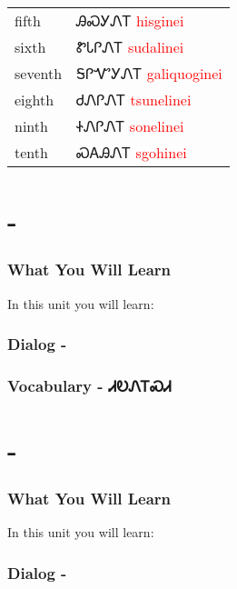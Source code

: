 \begin{tabular}{p{3cm} p{11cm}}
fifth & ᎯᏍᎩᏁᎢ 
 \newline \textcolor{red}{hisginei}\\
sixth & ᏑᏓᎵᏁᎢ 
 \newline \textcolor{red}{sudalinei}\\
seventh & ᎦᎵᏉᎩᏁᎢ 
 \newline \textcolor{red}{galiquoginei}\\
eighth & ᏧᏁᎵᏁᎢ 
 \newline \textcolor{red}{tsunelinei}\\
ninth & ᏐᏁᎵᏁᎢ 
 \newline \textcolor{red}{sonelinei}\\
tenth & ᏍᎪᎯᏁᎢ 
 \newline \textcolor{red}{sgohinei}\\
\end{tabular}

\chapter{ - }
\subsection{What You Will Learn}
In this unit you will learn:


\subsection{Dialog - }
\subsection{Vocabulary - ᏗᎧᏁᎢᏍᏗ }



\chapter{ - }
\subsection{What You Will Learn}
In this unit you will learn:
\subsection{Dialog - }
